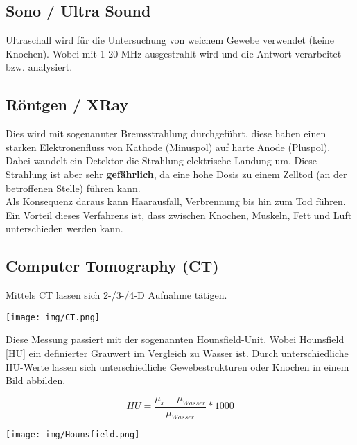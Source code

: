 \documentclass{report}
\newenvironment{Figure}
	{\par\medskip\noindent\minipage{\linewidth}}
	{\endminipage\par\medskip}
\theoremstyle{definition}
\theoremstyle{example}
\begin{document}
\subsection{Sono / Ultra Sound}
Ultraschall wird für die Untersuchung von weichem Gewebe verwendet (keine Knochen). Wobei mit 1-20 MHz ausgestrahlt wird und die Antwort verarbeitet bzw. analysiert.

\subsection{Röntgen / XRay}
Dies wird mit sogenannter Bremsstrahlung durchgeführt, diese haben einen starken Elektronenfluss von Kathode (Minuspol) auf harte Anode (Pluspol). Dabei wandelt ein Detektor die Strahlung elektrische Landung um. Diese Strahlung ist aber sehr \textbf{gefährlich}, da eine hohe Dosis zu einem Zelltod (an der betroffenen Stelle) führen kann.\\
Als Konsequenz daraus kann Haarausfall, Verbrennung bis hin zum Tod führen. \\
Ein Vorteil dieses Verfahrens ist, dass zwischen Knochen, Muskeln, Fett und Luft unterschieden werden kann. 

\subsection{Computer Tomography (CT)}
Mittels CT lassen sich 2-/3-/4-D Aufnahme tätigen. 

\begin{Figure}
   \centering
    \texttt{[image: img/CT.png]}
        \label{fig:Abbildung der unterschiedlichen Achsen im CT-Verfahren}
    \end{Figure}

Diese Messung passiert mit der sogenannten Hounsfield-Unit. Wobei Hounsfield [HU] ein definierter Grauwert im Vergleich zu Wasser ist. Durch unterschiedliche HU-Werte lassen sich unterschiedliche Gewebestrukturen oder Knochen in einem Bild abbilden.

\begin{equation}
   HU = \frac{\mu_x - \mu_{Wasser}}{\mu_{Wasser}} * 1000
\end{equation}

\begin{Figure}
   \centering
    \texttt{[image: img/Hounsfield.png]}
        \label{fig:Beispielmessgroessen durch Messung mit HU}
    \end{Figure}
\end{document}
